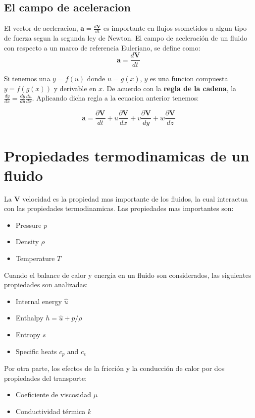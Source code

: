 \documentclass[10pt, oneside]{article}
\begin{document}
\subsection{El campo de aceleracion}
El vector de aceleracion, $\mathbf{a}=\frac{d\mathbf{V}}{dt}$ es importante en flujos ssometidos a algun tipo de fuerza segun la segunda ley de Newton. El campo de aceleraci\'on de un fluido con respecto a un marco de referencia Euleriano, se define como:
$$
\mathbf{a}=\frac{d\mathbf{V}}{dt}
$$

Si tenemos una  $y=f(u)$ donde $u=g(x)$, $y$ es una funcion compuesta $y=f(g(x))$ y derivable en $x$. De acuerdo con la \textbf{regla de la cadena}, la $\frac{dy}{dx}=\frac{dy}{du} \frac{du}{dx}$. Aplicando dicha regla a la ecuacion anterior tenemos: 

$$
\mathbf{a}=\frac{\partial\mathbf{V}}{dt} + u\frac{\partial\mathbf{V}}{dx} + v\frac{\partial\mathbf{V}}{dy} + w\frac{\partial\mathbf{V}}{dz}
$$

\section{Propiedades termodinamicas de un fluido}
La $\mathbf{V}$ velocidad es la propiedad mas importante de los fluidos, la cual interactua con las propiedades  termodinamicas. Las propiedades mas importantes son:
\begin{itemize}
\item Pressure $p$
\item Density $\rho$
\item Temperature $T$
\end{itemize}

Cuando el balance de calor y energia en un fluido son considerados, las siguientes propiedades son analizadas:
\begin{itemize}
\item Internal energy $\hat{u}$
\item Enthalpy $h=\hat{u}+p/\rho$
\item Entropy $s$
\item Specific heats $c_p$ and $c_v$
\end{itemize}

Por otra parte, los efectos de la fricci\'on y la conducci\'on de calor por dos propiedades del transporte:
\begin{itemize}
\item Coeficiente de viscosidad $\mu$
\item Conductividad t\'ermica $k$
\end{itemize}
\end{document}
